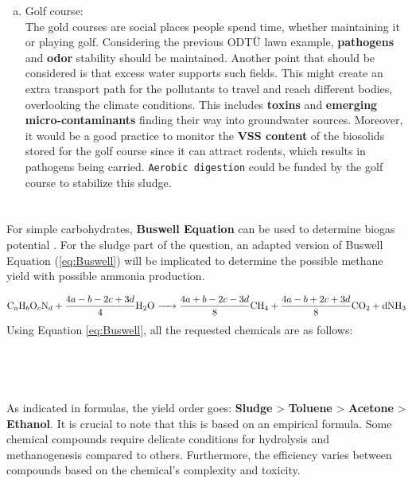 \documentclass[a4paper]{article}
\begin{document}
\begin{enumerate}[a)]
    \item Golf course:\\
    The gold courses are social places people spend time, whether maintaining it or playing golf. Considering the previous ODTÜ lawn example, \textbf{pathogens} and \textbf{odor} stability should be maintained. Another point that should be considered is that excess water supports such fields. This might create an extra transport path for the pollutants to travel and reach different bodies, overlooking the climate conditions. This includes \textbf{toxins} and \textbf{emerging micro-contaminants} finding their way into groundwater sources. Moreover, it would be a good practice to monitor the \textbf{VSS content} of the biosolids stored for the golf course since it can attract rodents, which results in pathogens being carried\autocite{vesilind1988}. \texttt{Aerobic digestion} could be funded by the golf course to stabilize this sludge.
\end{enumerate}
\section{} %
\begin{minipage}[c]{0.5\textwidth}
For simple carbohydrates, \textbf{Buswell Equation} can be used to determine biogas potential \autocite{buswell1933}. For the sludge part of the question, an adapted version of Buswell Equation (\ref{eq:Buswell}) will be implicated to determine the possible methane yield with possible ammonia production\autocite{Angelidaki2004, sialve2009}.
\end{minipage}
\hfill
\begin{minipage}{0.4\textwidth}
\end{minipage}
\begin{equation}
    \ce{C_aH_bO_cN_d + $\frac{4a - b - 2c + 3d}{4}$H2O -> $\frac{4a + b - 2c - 3d}{8}$CH4 +  $\frac{4a - b + 2c + 3d}{8}$CO2 + dNH3}\label{eq:Buswell}
\end{equation}
Using Equation \ref{eq:Buswell}, all the requested chemicals are as follows:\\
\\
\\
\\
\\
As indicated in formulas, the yield order goes: \textbf{Sludge} > \textbf{Toluene} > \textbf{Acetone} > \textbf{Ethanol}. It is crucial to note that this is based on an empirical formula. Some chemical compounds require delicate conditions for hydrolysis and methanogenesis compared to others. Furthermore, the efficiency varies between compounds based on the chemical's complexity and toxicity\autocite{Edwards1994}.
\end{document}

